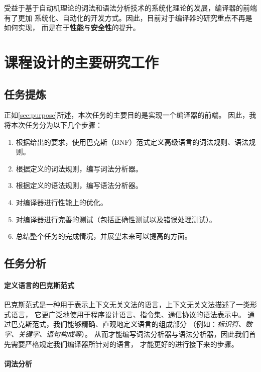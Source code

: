  受益于基于自动机理论的词法和语法分析技术的系统化理论的发展，编译器的前端有了更加
 系统化、自动化的开发方式。因此，目前对于编译器的研究重点不再是如何实现，
 而是在于{\bf 性能}与{\bf 安全性}的提升。\cite{Advanced-compiler-optim,53e9b0b2b7602d9703b20db9}

\section{课程设计的主要研究工作}

\subsection{任务提炼}

正如\autoref{sec:purpose}所述，本次任务的主要目的是实现一个编译器的前端。
因此，我将本次任务分为以下几个步骤：

\begin{enumerate}
  \item 根据给出的要求，使用巴克斯（BNF）范式定义高级语言的词法规则、语法规则。
  \item 根据定义的词法规则，编写词法分析器。
  \item 根据定义的语法规则，编写语法分析器。
  \item 对编译器进行性能上的优化。
  \item 对编译器进行完善的测试（包括正确性测试以及错误处理测试）。
  \item 总结整个任务的完成情况，并展望未来可以提高的方面。
\end{enumerate}

\subsection{任务分析}

\paragraph{定义语言的巴克斯范式}

巴克斯范式是一种用于表示上下文无关文法的语言，上下文无关文法描述了一类形式语言，
它更广泛地使用于程序设计语言、指令集、通信协议的语法表示中。
通过巴克斯范式，我们能够精确、直观地定义语言的组成部分
（例如：{\it 标识符、数字、关键字、语句构成等}）。
从而才能编写词法分析器与语法分析器，因此我们首先需要严格规定我们编译器所针对的语言，
才能更好的进行接下来的步骤。

\paragraph{词法分析}

